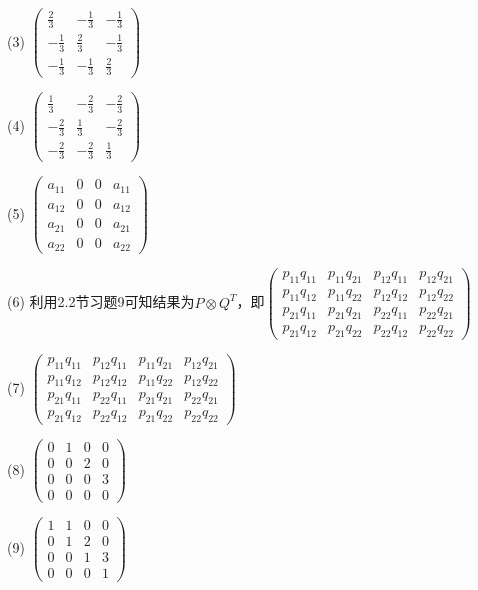 \documentclass[a4paper,UTF8,fontset=windows]{ctexart}
\begin{document}
\begin{enumerate}
(3) $\begin{pmatrix}\frac{2}{3}&-\frac{1}{3}&-\frac{1}{3}\\[1.5ex]-\frac{1}{3}&\frac{2}{3}&-\frac{1}{3}\\[1.5ex]-\frac{1}{3}&-\frac{1}{3}&\frac{2}{3}\end{pmatrix}$

(4) $\begin{pmatrix}\frac{1}{3}&-\frac{2}{3}&-\frac{2}{3}\\[1.5ex]-\frac{2}{3}&\frac{1}{3}&-\frac{2}{3}\\[1.5ex]-\frac{2}{3}&-\frac{2}{3}&\frac{1}{3}\end{pmatrix}$

(5) $\begin{pmatrix}a_{11}&0&0&a_{11}\\a_{12}&0&0&a_{12}\\a_{21}&0&0&a_{21}\\a_{22}&0&0&a_{22}\end{pmatrix}$

(6) 利用2.2节习题9可知结果为$P\otimes Q^T$，即$\begin{pmatrix}p_{11}q_{11}&p_{11}q_{21}&p_{12}q_{11}&p_{12}q_{21}\\p_{11}q_{12}&p_{11}q_{22}&p_{12}q_{12}&p_{12}q_{22}\\p_{21}q_{11}&p_{21}q_{21}&p_{22}q_{11}&p_{22}q_{21}\\p_{21}q_{12}&p_{21}q_{22}&p_{22}q_{12}&p_{22}q_{22}\end{pmatrix}$

(7) $\begin{pmatrix}p_{11}q_{11}&p_{12}q_{11}&p_{11}q_{21}&p_{12}q_{21}\\p_{11}q_{12}&p_{12}q_{12}&p_{11}q_{22}&p_{12}q_{22}\\p_{21}q_{11}&p_{22}q_{11}&p_{21}q_{21}&p_{22}q_{21}\\p_{21}q_{12}&p_{22}q_{12}&p_{21}q_{22}&p_{22}q_{22}\end{pmatrix}$

(8) $\begin{pmatrix}0&1&0&0\\0&0&2&0\\0&0&0&3\\0&0&0&0\end{pmatrix}$

(9) $\begin{pmatrix}1&1&0&0\\0&1&2&0\\0&0&1&3\\0&0&0&1\end{pmatrix}$


\end{enumerate}
\end{document}
